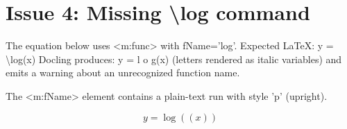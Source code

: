 \documentclass[11pt,a4paper]{article}
\begin{document}
\section{Issue 4: Missing \textbackslash{}log command}

The equation below uses <m:func> with fName='log'.
Expected LaTeX: y = \textbackslash{}log(x)
Docling produces: y = l o g(x)  (letters rendered as italic variables)
and emits a warning about an unrecognized function name.

The <m:fName> element contains a plain-text run with style 'p' (upright).

$$y = \log(\left(x\right))$$
\end{document}
